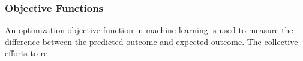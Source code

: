 \subsubsection{Objective Functions}
An optimization objective function in machine learning is used to measure the difference between the predicted outcome and expected outcome. The collective efforts to re